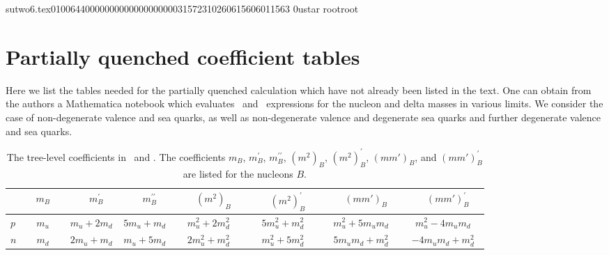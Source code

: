                                                                                                                                                                                                                                                                                       sutwo6.tex                                                                                          0100644 0000000 0000000 00000315723 10260615606 011563  0                                                                                                    ustar   root                            root                                                                                                                                                                                                                   \documentclass[prd,amssymb,amsmath,showpacs,nofootinbib,superscriptaddress]{revtex4}
\begin{document}




%
%
%
%
%
%
%
%
%
%
%
%
\section{Partially quenched coefficient tables}\label{ap:N}

Here we list the tables needed for the partially quenched calculation
which have not already been listed in the text.  One can obtain from the authors a Mathematica notebook which evaluates \PQCPT\ and \CPT\ 
expressions for the nucleon and delta masses in various limits.  We
consider the case of non-degenerate valence and sea quarks, as well as
non-degenerate valence and degenerate sea quarks and further
degenerate valence and sea quarks.

\begin{table}
\caption{The tree-level coefficients in \CPT\ and \PQCPT. The
  coefficients $m_B$, $m_B^\prime$, $m_B^{\prime \prime}$, $(m^2)_B$,
  $(m^2)_B^\prime$, $(mm')_B$, and $(mm')_B^\prime$ are listed for the
  nucleons $B$.}
\begin{tabular}{l | c c c c c c c}
 & $\quad m_B \quad $ & $\qquad m_B^\prime \quad$ & $\qquad m_B^{\prime \prime} \quad$ 
 & $ \qquad (m^2)_B \quad $ & $\qquad (m^2)_B^\prime \quad $ & $\qquad (m m' )_B \quad$ 
 & $\qquad (mm')_B^\prime \quad$  \\
\hline
$p$
 & $m_u$ 
 & $m_u + 2 m_d$ 
 & $5 m_u + m_d$ 
 & $m_u^2 + 2 m_d^2$ 
 & $5 m_u^2 + m_d^2$ 
 & $m_u^2 + 5 m_u m_d$ 
 & $  m_u^2 - 4 m_u m_d$ \\    
$n$
 & $m_d$ 
 & $2 m_u + m_d$ 
 & $m_u + 5 m_d$ 
 & $2 m_u^2 + m_d^2$ 
 & $m_u^2 + 5 m_d^2$ 
 & $5 m_u m_d + m_d^2$ 
 & $- 4 m_u m_d + m_d^2$
\end{tabular}
\label{t:mB}
\end{table}
\end{document}
